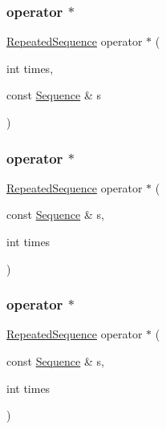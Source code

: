 \subsubsection{\texorpdfstring{operator $\ast$}{operator *}\hspace{0.1cm}{\footnotesize\ttfamily [2/18]}}
{\footnotesize\ttfamily \mbox{\hyperlink{classfakeit_1_1RepeatedSequence}{Repeated\+Sequence}} operator $\ast$ (\begin{DoxyParamCaption}\item[{int}]{times,  }\item[{const \mbox{\hyperlink{classfakeit_1_1Sequence}{Sequence}} \&}]{s }\end{DoxyParamCaption})\hspace{0.3cm}{\ttfamily [friend]}}

\mbox{\label{classfakeit_1_1RepeatedSequence_ab856dedd10fec617583599e03f3c9a80}} 
\subsubsection{\texorpdfstring{operator $\ast$}{operator *}\hspace{0.1cm}{\footnotesize\ttfamily [3/18]}}
{\footnotesize\ttfamily \mbox{\hyperlink{classfakeit_1_1RepeatedSequence}{Repeated\+Sequence}} operator $\ast$ (\begin{DoxyParamCaption}\item[{const \mbox{\hyperlink{classfakeit_1_1Sequence}{Sequence}} \&}]{s,  }\item[{int}]{times }\end{DoxyParamCaption})\hspace{0.3cm}{\ttfamily [friend]}}

\mbox{\label{classfakeit_1_1RepeatedSequence_ab856dedd10fec617583599e03f3c9a80}} 
\subsubsection{\texorpdfstring{operator $\ast$}{operator *}\hspace{0.1cm}{\footnotesize\ttfamily [4/18]}}
{\footnotesize\ttfamily \mbox{\hyperlink{classfakeit_1_1RepeatedSequence}{Repeated\+Sequence}} operator $\ast$ (\begin{DoxyParamCaption}\item[{const \mbox{\hyperlink{classfakeit_1_1Sequence}{Sequence}} \&}]{s,  }\item[{int}]{times }\end{DoxyParamCaption})\hspace{0.3cm}{\ttfamily [friend]}}

